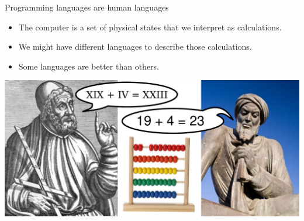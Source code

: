 \documentclass[aspectratio=169]{beamer}
\begin{document}
\begin{frame}{Programming languages are human languages}
\vspace{0.25 cm}
\begin{itemize}
\item The computer is a set of physical states that we interpret as calculations.
\item We might have different languages to describe those calculations.
\item Some languages are better than others.
\end{itemize}

\begin{center}
\includegraphics[width=0.9\linewidth]{abacus_ptolemy_al-khwarizmi.pdf}
\end{center}
\end{frame}





\end{document}
